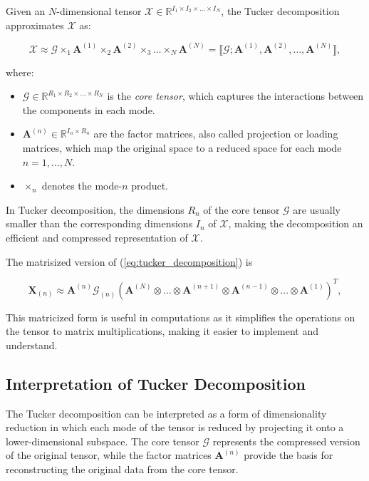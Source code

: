 \documentclass[a4paper,14pt]{article}
\theoremstyle{plain} %
\theoremstyle{definition} %
\theoremstyle{remark} %
\theoremstyle{definition}
\theoremstyle{remark}
\theoremstyle{remark}
\begin{document}
	Given an \( N \)-dimensional tensor \( \mathcal{X} \in \mathbb{R}^{I_1 \times I_2 \times \dots \times I_N} \), the Tucker decomposition approximates \( \mathcal{X} \) as:
	
	\begin{equation}
		\mathcal{X} \approx \mathcal{G} \times_1 \mathbf{A}^{(1)} \times_2 \mathbf{A}^{(2)} \times_3 \dots \times_N \mathbf{A}^{(N)} = \llbracket \mathcal{G}; \mathbf{A}^{(1)}, \mathbf{A}^{(2)}, \ldots, \mathbf{A}^{(N)} \rrbracket,
		\label{eq:tucker_decomposition}
	\end{equation}
	
	where:
	\begin{itemize}
		\item \( \mathcal{G} \in \mathbb{R}^{R_1 \times R_2 \times \dots \times R_N} \) is the \textit{core tensor}, which captures the interactions between the components in each mode.
		\item \( \mathbf{A}^{(n)} \in \mathbb{R}^{I_n \times R_n} \) are the factor matrices, also called projection or loading matrices, which map the original space to a reduced space for each mode \( n = 1, \dots, N \).
		\item \( \times_n \) denotes the mode-\( n \) product.
	\end{itemize}
	
	In Tucker decomposition, the dimensions \( R_n \) of the core tensor \( \mathcal{G} \) are usually smaller than the corresponding dimensions \( I_n \) of \( \mathcal{X} \), making the decomposition an efficient and compressed representation of \( \mathcal{X} \).
	
	The matrisized version of (\ref{eq:tucker_decomposition}) is
	
	\[
	\mathbf{X}_{(n)} \approx \mathbf{A}^{(n)} \mathcal{G}_{(n)} \left( \mathbf{A}^{(N)} \otimes \dots \otimes \mathbf{A}^{(n+1)} \otimes \mathbf{A}^{(n-1)} \otimes \dots \otimes \mathbf{A}^{(1)} \right)^T,
	\]
	
	This matricized form is useful in computations as it simplifies the operations on the tensor to matrix multiplications, making it easier to implement and understand.
	
	\subsection{Interpretation of Tucker Decomposition}
	
	The Tucker decomposition can be interpreted as a form of dimensionality reduction in which each mode of the tensor is reduced by projecting it onto a lower-dimensional subspace. The core tensor \( \mathcal{G} \) represents the compressed version of the original tensor, while the factor matrices \( \mathbf{A}^{(n)} \) provide the basis for reconstructing the original data from the core tensor.
	
\end{document}
